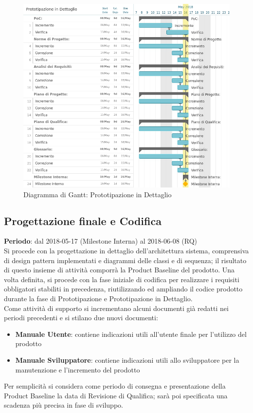 \begin{figure}
	\centerline{\includegraphics[scale=0.5]{img/DiagrammiGantt/PrototipazioneDettaglio.jpg}}
	\caption{Diagramma di Gantt: Prototipazione in Dettaglio}
\end{figure}
\clearpage

\subsection{Progettazione finale e Codifica}
\textbf{Periodo}: dal 2018-05-17 (Milestone Interna) al 2018-06-08 (RQ)\\

Si procede con la progettazione in dettaglio dell'architettura sistema, comprensiva di design pattern implementati e diagrammi delle classi e di sequenza; il risultato di questo insieme di attività comporrà la Product Baseline del prodotto. Una volta definita, si procede con la fase iniziale di codifica per realizzare i requisiti obbligatori stabiliti in precedenza, riutilizzando ed ampliando il codice prodotto durante la fase di Prototipazione e Prototipazione in Dettaglio. \\
Come attività di supporto si incrementano alcuni documenti già redatti nei periodi precedenti e si stilano due nuovi documenti:
\begin{itemize}
	\item \textbf{Manuale Utente}: contiene indicazioni utili all'utente finale per l'utilizzo del prodotto
	\item \textbf{Manuale Sviluppatore}: contiene indicazioni utili allo sviluppatore per la manutenzione e l'incremento del prodotto
\end{itemize}
Per semplicità si considera come periodo di consegna e presentazione della Product Baseline la data di Revisione di Qualifica; sarà poi specificata una scadenza più precisa in fase di sviluppo. \\

